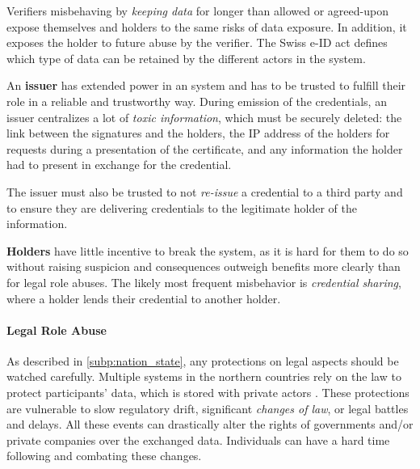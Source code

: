 Verifiers misbehaving by \emph{keeping data} for longer than allowed or agreed-upon expose themselves and holders to the same risks of data exposure. 
In addition, it exposes the holder to future abuse by the verifier.
The Swiss e-ID act defines which type of data can be retained by the different actors in the system.

An \textbf{issuer} has extended power in an \eid system and has to be trusted 
to fulfill their role in a reliable and trustworthy way.
During emission of the credentials, an issuer centralizes a lot of \emph{toxic information}, which must be securely deleted: the link between the signatures and the holders,
the IP address of the holders for requests during a presentation of the certificate, and any information the holder had to present in exchange for the credential.

The issuer must also be trusted to
not \emph{re-issue} a credential to a third party and to ensure they are delivering credentials to the legitimate holder of the information.

\textbf{Holders} have little incentive to break the system, as it is hard for them to do so without raising suspicion and consequences outweigh benefits
more clearly than for legal role abuses.
The likely most frequent misbehavior is \emph{credential sharing}, where a holder lends their credential to another holder.

\paragraph{Legal Role Abuse}

As described in \ref{subp:nation_state}, any protections on legal aspects should be watched carefully.
Multiple \eid systems in the northern countries rely on the law to protect participants'
data, which is stored with private actors \cite{BankID25}.
These protections are vulnerable to slow regulatory drift, significant \emph{changes of law}, or legal battles and delays.
All these events can drastically alter the rights of governments and/or private companies over the exchanged data.
Individuals can have a hard time following and combating these changes.

